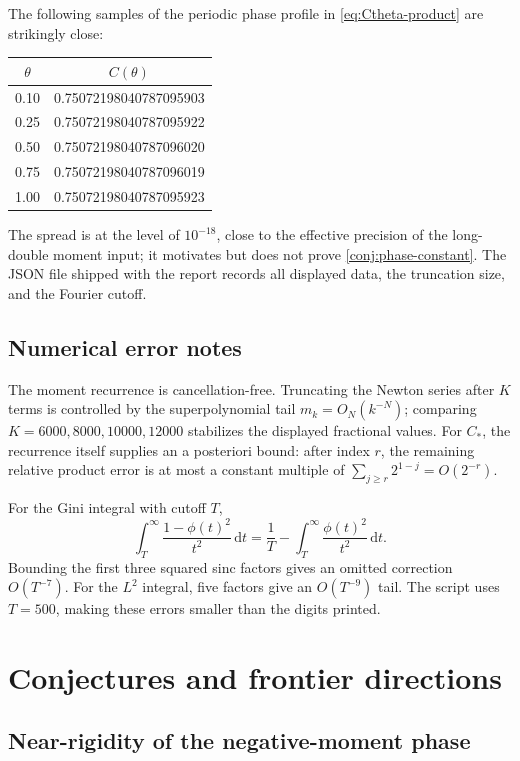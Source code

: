 \documentclass[11pt,oneside]{article}
\theoremstyle{definition}
\newcommand{\dd}{\,\mathrm d}
\begin{document}
The following samples of the periodic phase profile in \cref{eq:Ctheta-product} are
strikingly close:
\begin{center}
\begin{tabular}{@{}c@{\qquad}c@{}}
\toprule
\(\theta\)&\(C(\theta)\)\\
\midrule
0.10&0.75072198040787095903\\
0.25&0.75072198040787095922\\
0.50&0.75072198040787096020\\
0.75&0.75072198040787096019\\
1.00&0.75072198040787095923\\
\bottomrule
\end{tabular}
\end{center}
The spread is at the level of \(10^{-18}\), close to the effective precision of the
long-double moment input; it motivates but does not prove \cref{conj:phase-constant}.
The JSON file shipped with the report records all displayed data, the truncation size,
and the Fourier cutoff.

\subsection{Numerical error notes}

The moment recurrence is cancellation-free.  Truncating the Newton series after \(K\)
terms is controlled by the superpolynomial tail \(m_k=O_N(k^{-N})\); comparing
\(K=6000,8000,10000,12000\) stabilizes the displayed fractional values.
For \(C_*\), the recurrence itself supplies an a posteriori bound: after index \(r\),
the remaining relative product error is at most a constant multiple of
\(\sum_{j\ge r}2^{1-j}=O(2^{-r})\).

For the Gini integral with cutoff \(T\),
\[
 \int_T^\infty\frac{1-\phi(t)^2}{t^2}\dd t
 =\frac1T-\int_T^\infty\frac{\phi(t)^2}{t^2}\dd t.
\]
Bounding the first three squared sinc factors gives an omitted correction
\(O(T^{-7})\).  For the \(L^2\) integral, five factors give an \(O(T^{-9})\) tail.
The script uses \(T=500\), making these errors smaller than the digits printed.

\section{Conjectures and frontier directions}

\subsection{Near-rigidity of the negative-moment phase}
\end{document}
